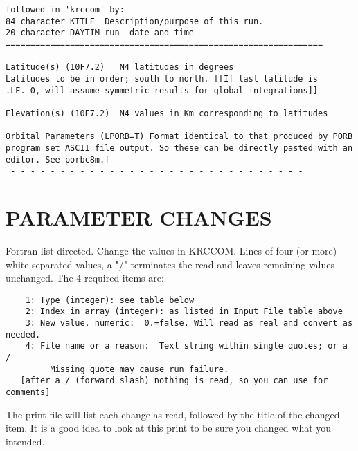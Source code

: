\documentclass{article}
\begin{document}
\begin{verbatim}
followed in 'krccom' by: 
84 character KITLE	Description/purpose of this run.
20 character DAYTIM	run  date and time
================================================================

Latitude(s) (10F7.2)   N4 latitudes in degrees
Latitudes to be in order; south to north. [[If last latitude is
.LE. 0, will assume symmetric results for global integrations]]

Elevation(s) (10F7.2)  N4 values in Km corresponding to latitudes

Orbital Parameters (LPORB=T) Format identical to that produced by PORB
program set ASCII file output. So these can be directly pasted with an
editor. See porbc8m.f
 - - - - - - - - - - - - - - - - - - - - - - - - - - - - - - 
\end{verbatim}

\section{PARAMETER CHANGES \label{pc}}

Fortran list-directed.  Change the values in KRCCOM.  Lines of four (or more) 
white-separated values, a "/" terminates the read and leaves remaining values
unchanged.  The 4 required items are:
\vspace{-3.mm} 
\begin{verbatim}
    1: Type (integer): see table below
    2: Index in array (integer): as listed in Input File table above
    3: New value, numeric:  0.=false. Will read as real and convert as needed.
    4: File name or a reason:  Text string within single quotes; or a /
         Missing quote may cause run failure.
   [after a / (forward slash) nothing is read, so you can use for comments]
\end{verbatim}
The print file will list each change as read, followed by the title of the
changed item. It is a good idea to look at this print to be sure you changed
what you intended.
\end{document}
